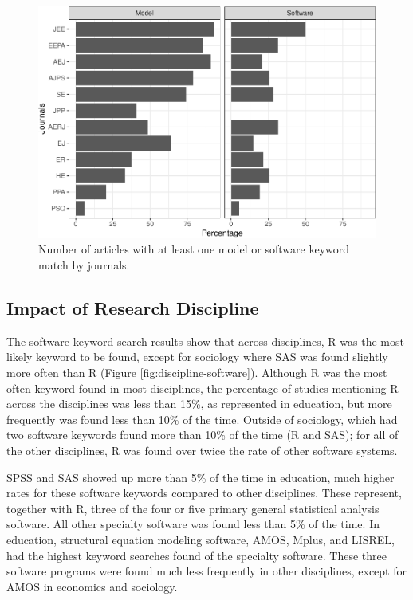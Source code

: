 \documentclass[
  english,
  ,man]{apa6}
\begin{document}
\begin{figure}
\centering
\includegraphics{software_files/figure-latex/count-software-1.pdf}
\caption{\label{fig:count-software}Number of articles with at least one model or software keyword match by journals.}
\end{figure}

\hypertarget{impact-of-research-discipline}{%
\subsection{Impact of Research Discipline}\label{impact-of-research-discipline}}

The software keyword search results show that across disciplines, R was the most likely keyword to be found, except for sociology where SAS was found slightly more often than R (Figure \ref{fig:discipline-software}). Although R was the most often keyword found in most disciplines, the percentage of studies mentioning R across the disciplines was less than 15\%, as represented in education, but more frequently was found less than 10\% of the time. Outside of sociology, which had two software keywords found more than 10\% of the time (R and SAS); for all of the other disciplines, R was found over twice the rate of other software systems.

SPSS and SAS showed up more than 5\% of the time in education, much higher rates for these software keywords compared to other disciplines. These represent, together with R, three of the four or five primary general statistical analysis software. All other specialty software was found less than 5\% of the time. In education, structural equation modeling software, AMOS, Mplus, and LISREL, had the highest keyword searches found of the specialty software. These three software programs were found much less frequently in other disciplines, except for AMOS in economics and sociology.
\end{document}
